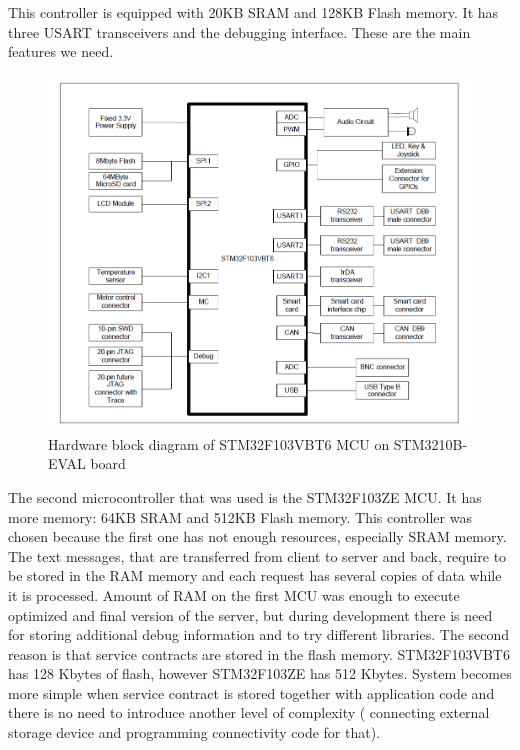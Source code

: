 This controller is equipped with 20KB SRAM and 128KB Flash memory.
It has three USART transceivers and the debugging interface.
These are the main features we need.

\begin{center}
 \begin{figure}[h]
	\includegraphics[height=0.5\textheight]{../images/implementation/embedded_server/stm32f103vbt6_hardware.png}
	\caption{Hardware block diagram of STM32F103VBT6 MCU on STM3210B-EVAL board
	\cite{stm_eval_board_manual}}
	\label{fig:stm32f103vbt6_hardware}
 \end{figure}
\end{center}

The second microcontroller that was used  is the STM32F103ZE MCU. It has more
memory:
64KB SRAM and 512KB Flash memory. This controller was chosen because the first
one has not enough resources, especially SRAM memory. The text messages, that
are transferred from client to server and back, require to be stored in the RAM
memory and each request has several copies of data while it is processed.
Amount of RAM on the first MCU was enough to execute optimized and final version of the server, but during development there is need for
storing additional debug information and to try different libraries.
The second reason is that service contracts are stored in the flash memory.
STM32F103VBT6 has 128 Kbytes of flash, however STM32F103ZE has 512 Kbytes.
System becomes more simple when service contract is stored together with
application code and there is no need to introduce another level of complexity (
connecting external storage device and programming connectivity code for
that). 



